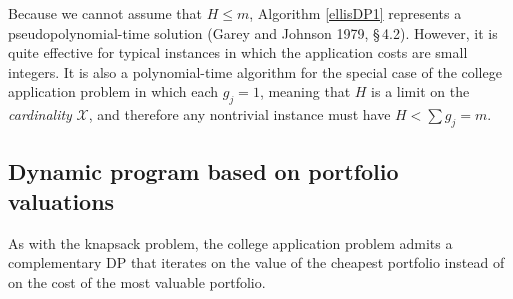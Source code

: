 Because we cannot assume that $H \leq m$, Algorithm \ref{ellisDP1} represents a pseudopolynomial-time solution (Garey and Johnson 1979, \S\,4.2). However, it is quite effective for typical instances in which the application costs are small integers. It is also a polynomial-time algorithm for the special case of the college application problem in which each $g_j = 1$, meaning that $H$ is a limit on the \emph{cardinality} $\mathcal{X}$, and therefore any nontrivial instance must have $H < \sum g_j = m$. 

\subsection{Dynamic program based on portfolio valuations} \label{dpbasedonportfoliovaluations}

As with the knapsack problem, the college application problem admits a complementary DP that iterates on the value of the cheapest portfolio instead of on the cost of the most valuable portfolio.


